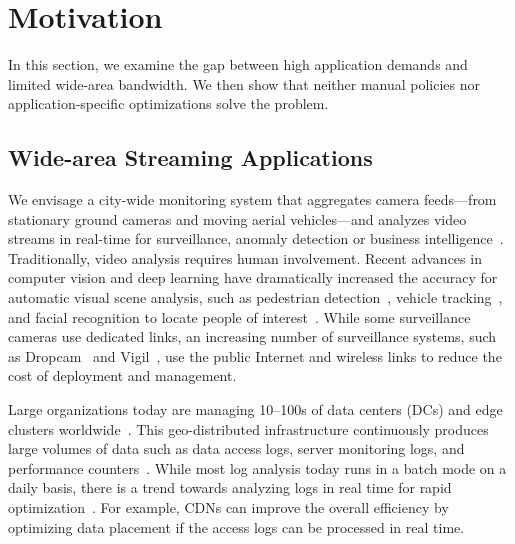 \section{Motivation}
\label{sec:motivation}

In this section, we examine the gap between high application demands and limited
wide-area bandwidth. We then show that neither manual policies nor
application-specific optimizations solve the problem.

\subsection{Wide-area Streaming Applications}
\label{sec:wide-area-streaming}

 We envisage a city-wide monitoring system that
aggregates camera feeds---from stationary ground cameras and moving aerial
vehicles---and analyzes video streams in real-time for surveillance, anomaly
detection or business intelligence~\cite{oh2011large}. Traditionally, video
analysis requires human involvement. Recent advances in computer vision and deep
learning have dramatically increased the accuracy for automatic visual scene
analysis, such as pedestrian detection~\cite{dollar2012pedestrian}, vehicle
tracking~\cite{coifman1998real}, and facial recognition to locate people of
interest~\cite{Lu:2015:SHF:2888116.2888245, parkhi2015deep}. While some
surveillance cameras use dedicated links, an increasing number of surveillance
systems, such as Dropcam~\cite{dropcam} and Vigil~\cite{zhang2015design}, use
the public Internet and wireless links to reduce the cost of deployment and
management.


 Large organizations today are managing
10--100s of data centers (DCs) and edge clusters
worldwide~\cite{calder2013mapping}. This geo-distributed infrastructure
continuously produces large volumes of data such as data access logs, server
monitoring logs, and performance counters~\cite{alspaugh2014analyzing,
  pu2015low, vulimiri2015global}. While most log analysis today runs in a batch
mode on a daily basis, there is a trend towards analyzing logs in real time for
rapid optimization~\cite{rabkin2014aggregation}. For example, CDNs can improve
the overall efficiency by optimizing data placement if the access logs can be
processed in real time. 


